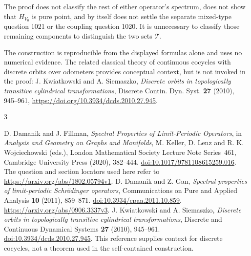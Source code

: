\documentclass[11pt,a4paper]{article}
\begin{document}
The proof does not classify the rest of either operator's spectrum, does
not show that \(H_{V_0}\) is pure point, and by itself does not settle
the separate mixed-type question 1021 or the coupling question 1020. It
is unnecessary to classify those remaining components to distinguish the
two sets \(\mathcal T\).

The construction is reproducible from the displayed formulas alone and
uses no numerical evidence. The related classical theory of continuous
cocycles with discrete orbits over odometers provides conceptual
context, but is not invoked in the proof: J. Kwiatkowski and A.
Siemaszko, \emph{Discrete orbits in topologically transitive cylindrical
transformations}, Discrete Contin. Dyn. Syst. \textbf{27} (2010),
945--961, \url{https://doi.org/10.3934/dcds.2010.27.945}.

\begin{thebibliography}{3}
\raggedright
{}
D. Damanik and J. Fillman,
\emph{Spectral Properties of Limit-Periodic Operators},
in \emph{Analysis and Geometry on Graphs and Manifolds},
M. Keller, D. Lenz and R. K. Wojciechowski (eds.),
London Mathematical Society Lecture Note Series~461,
Cambridge University Press (2020), 382--444.
\href{https://doi.org/10.1017/9781108615259.016}{doi:10.1017/9781108615259.016}.
The question and section locators used here refer to
\url{https://arxiv.org/abs/1802.05794v1}.
D. Damanik and Z. Gan,
\emph{Spectral properties of limit-periodic Schr\"odinger operators},
Communications on Pure and Applied Analysis \textbf{10} (2011),
859--871.
\href{https://doi.org/10.3934/cpaa.2011.10.859}{doi:10.3934/cpaa.2011.10.859}.
\url{https://arxiv.org/abs/0906.3337v3}.
J. Kwiatkowski and A. Siemaszko,
\emph{Discrete orbits in topologically transitive cylindrical transformations},
Discrete and Continuous Dynamical Systems \textbf{27} (2010), 945--961.
\href{https://doi.org/10.3934/dcds.2010.27.945}{doi:10.3934/dcds.2010.27.945}.
This reference supplies context for discrete cocycles, not a theorem used
in the self-contained construction.
\end{thebibliography}
\end{document}
